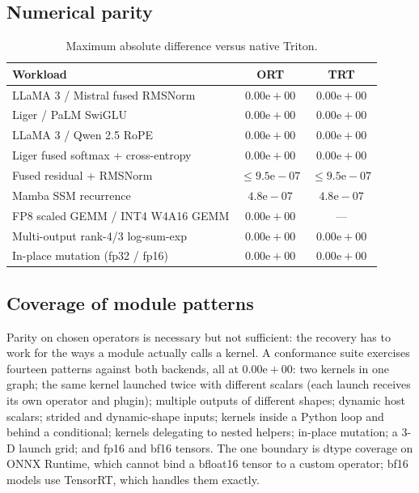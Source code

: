 \documentclass{article}
\begin{document}
\subsection{Numerical parity}

\begin{table}[t]
\centering
\small
\begin{tabular}{lcc}
\toprule
\textbf{Workload} & \textbf{ORT} & \textbf{TRT} \\ \midrule
LLaMA 3 / Mistral fused RMSNorm & $0.00\text{e}{+}00$ & $0.00\text{e}{+}00$ \\
Liger / PaLM SwiGLU & $0.00\text{e}{+}00$ & $0.00\text{e}{+}00$ \\
LLaMA 3 / Qwen 2.5 RoPE & $0.00\text{e}{+}00$ & $0.00\text{e}{+}00$ \\
Liger fused softmax + cross-entropy & $0.00\text{e}{+}00$ & $0.00\text{e}{+}00$ \\
Fused residual + RMSNorm & $\le 9.5\text{e}{-}07$ & $\le 9.5\text{e}{-}07$ \\
Mamba SSM recurrence & $4.8\text{e}{-}07$ & $4.8\text{e}{-}07$ \\
FP8 scaled GEMM / INT4 W4A16 GEMM & $0.00\text{e}{+}00$ & --- \\
Multi-output rank-4/3 log-sum-exp & $0.00\text{e}{+}00$ & $0.00\text{e}{+}00$ \\
In-place mutation (fp32 / fp16) & $0.00\text{e}{+}00$ & $0.00\text{e}{+}00$ \\
\bottomrule
\end{tabular}
\caption{Maximum absolute difference versus native Triton.}
\label{tab:parity}
\end{table}

\subsection{Coverage of module patterns}

Parity on chosen operators is necessary but not sufficient: the recovery has to
work for the ways a module actually calls a kernel. A conformance suite exercises
fourteen patterns against both backends, all at $0.00\text{e}{+}00$: two kernels
in one graph; the same kernel launched twice with different scalars (each launch
receives its own operator and plugin); multiple outputs of different shapes;
dynamic host scalars; strided and dynamic-shape inputs; kernels inside a Python
loop and behind a conditional; kernels delegating to nested helpers; in-place
mutation; a 3-D launch grid; and fp16 and bf16 tensors. The one boundary is dtype
coverage on ONNX Runtime, which cannot bind a bfloat16 tensor to a custom
operator; bf16 models use TensorRT, which handles them exactly.
\end{document}
